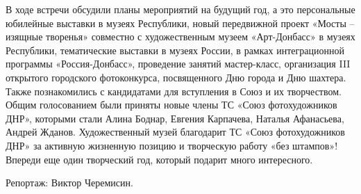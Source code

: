 В ходе встречи обсудили планы мероприятий на будущий год, а это персональные
юбилейные выставки в музеях Республики, новый передвижной проект «Мосты –
изящные творенья» совместно с художественным музеем «Арт-Донбасс» в музеях
Республики, тематические выставки в музеях России, в рамках интеграционной
программы «Россия-Донбасс», проведение занятий мастер-класс, организация III
открытого городского фотоконкурса, посвященного Дню города и Дню шахтера.
Также познакомились с кандидатами для вступления в Союз и их творчеством. Общим
голосованием были приняты новые члены ТС «Союз фотохудожников ДНР», которыми
стали Алина Боднар, Евгения Карпачева, Наталья Афанасьева, Андрей Жданов.
Художественный музей благодарит ТС «Союз фотохудожников ДНР» за активную
жизненную позицию и творческую работу «без штампов»! Впереди еще один
творческий год, который подарит много интересного.

Репортаж: Виктор Черемисин.
